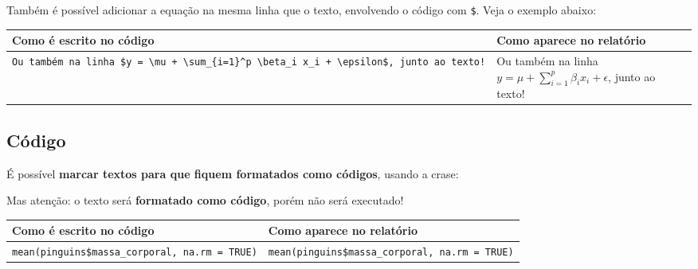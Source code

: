 \documentclass[
]{book}
\begin{document}
Também é possível adicionar a equação na mesma linha que o texto, envolvendo o código com \texttt{\$}. Veja o exemplo abaixo:

\begin{longtable}[]{@{}
  >{\raggedright\arraybackslash}p{}
  >{\raggedright\arraybackslash}p{}@{}}
\toprule\noalign{}
\begin{minipage}[b]{\linewidth}\raggedright
Como é escrito no código
\end{minipage} & \begin{minipage}[b]{\linewidth}\raggedright
Como aparece no relatório
\end{minipage} \\
\midrule\noalign{}
\endhead
\bottomrule\noalign{}
\endlastfoot
\texttt{Ou\ também\ na\ linha\ \$y\ =\ \textbackslash{}mu\ +\ \textbackslash{}sum\_\{i=1\}\^{}p\ \textbackslash{}beta\_i\ x\_i\ +\ \textbackslash{}epsilon\$,\ junto\ ao\ texto!} & Ou também na linha \(y = \mu + \sum_{i=1}^p \beta_i x_i + \epsilon\), junto ao texto! \\
\end{longtable}

\subsection{Código}\label{cuxf3digo}

É possível \textbf{marcar textos para que fiquem formatados como códigos}, usando a crase: \texttt{\textasciigrave{}}

Mas atenção: o texto será \textbf{formatado como código}, porém não será executado!

\begin{longtable}[]{@{}
  >{\raggedright\arraybackslash}p{}
  >{\raggedright\arraybackslash}p{}@{}}
\toprule\noalign{}
\begin{minipage}[b]{\linewidth}\raggedright
Como é escrito no código
\end{minipage} & \begin{minipage}[b]{\linewidth}\raggedright
Como aparece no relatório
\end{minipage} \\
\midrule\noalign{}
\endhead
\bottomrule\noalign{}
\endlastfoot
\texttt{\textasciigrave{}mean(pinguins\$massa\_corporal,\ na.rm\ =\ TRUE)\textasciigrave{}} & \texttt{mean(pinguins\$massa\_corporal,\ na.rm\ =\ TRUE)} \\
\end{longtable}
\end{document}

